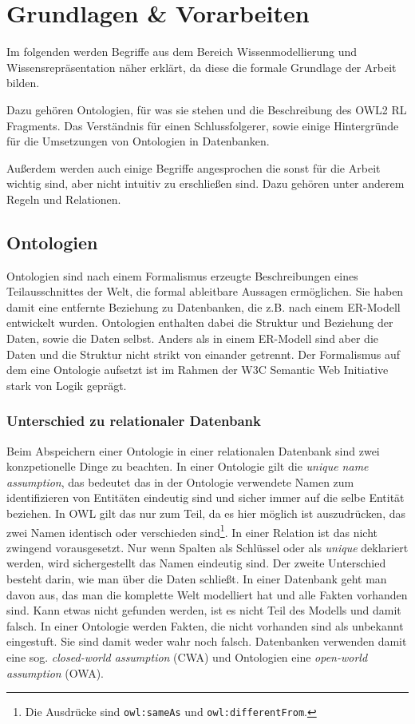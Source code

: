 \chapter{Grundlagen \& Vorarbeiten}
\label{kapitel-grundlagen}
Im folgenden werden Begriffe aus dem Bereich Wissenmodellierung und Wissensrepräsentation näher erklärt, da diese die formale Grundlage der Arbeit bilden.

Dazu gehören Ontologien, für was sie stehen und die Beschreibung des OWL2 RL Fragments. Das Verständnis für einen Schlussfolgerer, sowie einige Hintergründe für die Umsetzungen von Ontologien in Datenbanken.

Außerdem werden auch einige Begriffe angesprochen die sonst für die Arbeit wichtig sind, aber nicht intuitiv zu erschließen sind. Dazu gehören unter anderem Regeln und Relationen.

\section{Ontologien}

Ontologien sind nach einem Formalismus erzeugte Beschreibungen eines Teilausschnittes der Welt, die formal ableitbare Aussagen ermöglichen. Sie haben damit eine entfernte Beziehung zu Datenbanken, die z.B. nach einem ER-Modell entwickelt wurden. Ontologien enthalten dabei die Struktur und Beziehung der Daten, sowie die Daten selbst. Anders als in einem ER-Modell sind aber die Daten und die Struktur nicht strikt von einander getrennt. Der Formalismus auf dem eine Ontologie aufsetzt ist im Rahmen der W3C Semantic Web Initiative stark von Logik geprägt. \cite{Hesse2002}

\subsection{Unterschied zu relationaler Datenbank}

Beim Abspeichern einer Ontologie in einer relationalen Datenbank sind zwei konzpetionelle Dinge zu beachten. In einer Ontologie gilt die \emph{unique name assumption}, das bedeutet das in der Ontologie verwendete Namen zum identifizieren von Entitäten eindeutig sind und sicher immer auf die selbe Entität beziehen. In OWL gilt das nur zum Teil, da es hier möglich ist auszudrücken, das zwei Namen identisch oder verschieden sind\cite{OWL1}\footnote{Die Ausdrücke sind \texttt{owl:sameAs} und \texttt{owl:differentFrom}.}. In einer Relation ist das nicht zwingend vorausgesetzt. Nur wenn Spalten als Schlüssel oder als \emph{unique} deklariert werden, wird sichergestellt das Namen eindeutig sind.
Der zweite Unterschied besteht darin, wie man über die Daten schließt. In einer Datenbank geht man davon aus, das man die komplette Welt modelliert hat und alle Fakten vorhanden sind. Kann etwas nicht gefunden werden, ist es nicht Teil des Modells und damit falsch. In einer Ontologie werden Fakten, die nicht vorhanden sind als unbekannt eingestuft. Sie sind damit weder wahr noch falsch. Datenbanken verwenden damit eine sog. \emph{closed-world assumption} (CWA) und Ontologien eine \emph{open-world assumption} (OWA).

